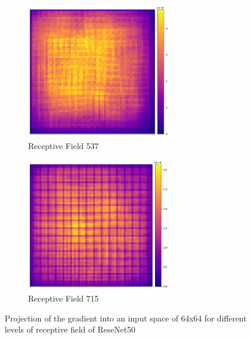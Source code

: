 \begin{figure}[H]
        \begin{subfigure}[b]{0.475\textwidth}   
            \centering 
            \includegraphics[width=0.7\textwidth]{images/gradientProjection_vgg19_3.png}
            \caption[]%
            {{\small Receptive Field 537}}    
            \label{fig:grad_projection_vgg_lvl3}
        \end{subfigure}
        \hfill
        \begin{subfigure}[b]{0.475\textwidth}   
            \centering 
            \includegraphics[width=0.7\textwidth]{images/gradientProjection_vgg19_4.png}
            \caption[]%
            {{\small Receptive Field 715}}    
            \label{fig:grad_projection_vgg_lvl4}
        \end{subfigure}
        \caption{\small Projection of the gradient into an input space of 64x64 for different levels of receptive field
        of ReseNet50}
        \label{fig:gradient_projection_vgg}
    \end{figure}



